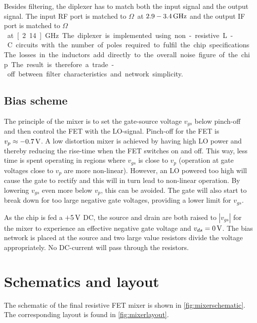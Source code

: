 			Besides  filtering, the diplexer has to match  both the input signal and the output signal. The input RF port is matched to \unit[50]{$\Omega$} at $\unit[2.9-3.4]{GHz}$ and the output IF port is matched to \unit[50]{$\Omega$} at \unit[2.14]{GHz}.

			The diplexer is implemented using non-resistive L-C circuits with the number of poles required to fulfil the chip specifications. The losses in the inductors add directly to the overall noise figure of the chip. The result is therefore a trade-off between filter characteristics and network simplicity.

		\subsection{Bias scheme}\label{sec:mixerbias}
			The principle of the mixer is to set the gate-source voltage $v_{gs}$ below pinch-off and then control the FET with the LO-signal. Pinch-off for the FET is $v_p\approx \unit[-0.7]{V}$. A low distortion mixer is achieved by having high LO power and thereby reducing the rise-time when the FET switches on and off. This way, less time is spent operating in regions where $v_{gs}$ is close to $v_p$ (operation at gate voltages close to $v_p$ are more non-linear). However, an LO powered too high will cause the gate to rectify and this will in turn lead to non-linear operation.\autocite{maas98} By lowering $v_{gs}$ even more below $v_p$, this can be avoided. The gate will also start to break down for too large negative gate voltages, providing a lower limit for $v_{gs}$.

			As the chip is fed a $+\unit[5]{V}$ DC, the source and drain are both raised to $|v_{gs}|$ for the mixer to experience an effective negative gate voltage and $v_{ds}=\unit[0]{V}$. The bias network is placed at the source and two large value resistors divide the voltage appropriately. No DC-current will pass through the resistors.

	\section{Schematics and layout}
		The schematic of the final resistive FET mixer is shown in \autoref{fig:mixerschematic}. The corresponding layout is found in \autoref{fig:mixerlayout}.

